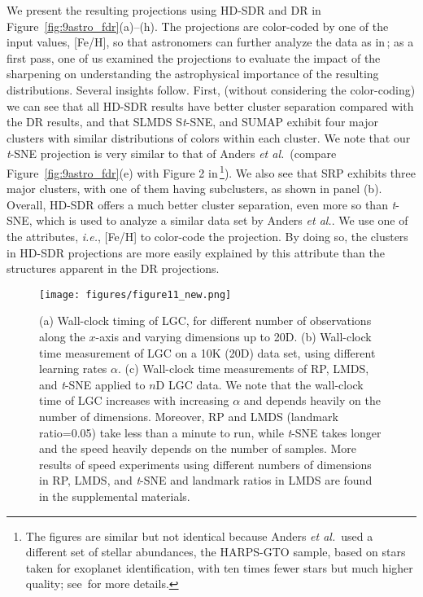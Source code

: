 \documentclass[sagev,Afour,times]{sagej}
\begin{document}
\par We present the resulting projections using HD-SDR and DR in Figure~\ref{fig:9astro_fdr}(a)--(h). The projections are color-coded by one of the input values, [Fe/H], so that astronomers can further analyze the data as in\,\cite{tsne:astro}; as a first pass, one of us examined the projections to evaluate the impact of the sharpening on understanding the astrophysical importance of the resulting distributions. Several insights follow. First, (without considering the color-coding) we can see that all HD-SDR results have better cluster separation compared with the DR results, and that SLMDS S\emph{t}-SNE, and SUMAP exhibit four major clusters with similar distributions of colors within each cluster. We note that our \emph{t}-SNE projection is very similar to that of Anders \emph{et al.}\ (compare Figure~\ref{fig:9astro_fdr}(e) with Figure 2 in\,\cite{tsne:astro}\footnote{The figures are similar but not identical because Anders \emph{et al.}\ used a different set of stellar abundances, the HARPS-GTO sample, based on stars taken for exoplanet identification, with ten times fewer stars but much higher quality; see\,\cite{tsne:astro} for more details.}). We also see that SRP exhibits three major clusters, with one of them having subclusters, as shown in panel (b). Overall, HD-SDR offers a much better cluster separation, even more so than \emph{t}-SNE, which is used to analyze a similar data set by Anders \emph{et al.}. We use one of the attributes, \emph{i.e.}, [Fe/H] to color-code the projection. By doing so, the clusters in HD-SDR projections are more easily explained by this attribute than the structures apparent in the DR projections.

\begin{figure}[htb]
  \centering
  \texttt{[image: figures/figure11\_new.png]}
  \parbox[t]{0.9\columnwidth}{\relax}
  \caption{\label{fig:11speed} (a) Wall-clock timing of LGC, for different number of observations along the $x$-axis and varying dimensions up to 20D. (b) Wall-clock time measurement of LGC on a 10$\mathrm{K}$ (20D) data set, using different learning rates $\alpha$. (c) Wall-clock time measurements of RP, LMDS, and \emph{t}-SNE applied to $n$D LGC data. We note that the wall-clock time of LGC increases with increasing $\alpha$ and depends heavily on the number of dimensions. Moreover, RP and LMDS (landmark ratio=0.05) take less than a minute to run, while \emph{t}-SNE takes longer and the speed heavily depends on the number of samples. More results of speed experiments using different numbers of dimensions in RP, LMDS, and \emph{t}-SNE and landmark ratios in LMDS are found in the supplemental materials.}
\end{figure}
\end{document}
